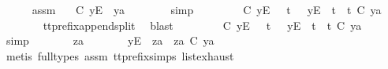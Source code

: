 \ \ \ \ \isamarkupfalse%
\ assm{}\ \isamarkupfalse%
\ {\isachardoublequoteopen}{\isasymsigma}{\isacharprime}\ {\isasymle}\isactrlsub C\ {\isacharbrackleft}{\isacharbrackleft}y{\isacharbrackright}\isactrlsub E{\isacharbrackright}\ {\isacharat}\ ya{\isachardoublequoteclose}\isanewline
\ \ \ \ \ \ \isamarkupfalse%
\ simp\isanewline
\ \ \ \ \isamarkupfalse%
\ \isamarkupfalse%
\ {\isachardoublequoteopen}{\isasymsigma}{\isacharprime}\ {\isasymle}\isactrlsub C\ {\isacharbrackleft}{\isacharbrackleft}y{\isacharbrackright}\isactrlsub E{\isacharbrackright}\ \ {\isasymor}\ {\isacharparenleft}{\isasymexists}t{\isacharprime}{\isachardot}\ {\isasymsigma}{\isacharprime}\ {\isacharequal}\ {\isacharbrackleft}{\isacharbrackleft}y{\isacharbrackright}\isactrlsub E{\isacharbrackright}\ {\isacharat}\ t{\isacharprime}\ {\isasymand}\ t{\isacharprime}\ {\isasymle}\isactrlsub C\ ya{\isacharparenright}{\isachardoublequoteclose}\isanewline
\ \ \ \ \ \ \isamarkupfalse%
\ tt{\isacharunderscore}prefix{\isacharunderscore}append{\isacharunderscore}split\ \isamarkupfalse%
\ blast\isanewline
\ \ \ \ \isamarkupfalse%
\ \isamarkupfalse%
\ {\isachardoublequoteopen}{\isasymsigma}{\isacharprime}\ {\isasymle}\isactrlsub C\ {\isacharbrackleft}{\isacharbrackleft}y{\isacharbrackright}\isactrlsub E{\isacharbrackright}\ \ {\isasymor}\ {\isacharparenleft}{\isasymexists}t{\isacharprime}{\isachardot}\ {\isasymsigma}{\isacharprime}\ {\isacharequal}\ {\isacharbrackleft}y{\isacharbrackright}\isactrlsub E\ {\isacharhash}\ t{\isacharprime}\ {\isasymand}\ t{\isacharprime}\ {\isasymle}\isactrlsub C\ ya{\isacharparenright}{\isachardoublequoteclose}\isanewline
\ \ \ \ \ \ \isamarkupfalse%
\ simp\isanewline
\ \ \ \ \isamarkupfalse%
\ \isamarkupfalse%
\ za\ \ {\isachardoublequoteopen}{\isasymsigma}{\isacharprime}\ {\isacharequal}\ {\isacharbrackleft}{\isacharbrackright}\ {\isasymor}\ {\isacharparenleft}{\isasymsigma}{\isacharprime}\ {\isacharequal}\ {\isacharbrackleft}y{\isacharbrackright}\isactrlsub E\ {\isacharhash}\ za\ {\isasymand}\ za\ {\isasymle}\isactrlsub C\ ya{\isacharparenright}{\isachardoublequoteclose}\isanewline
\ \ \ \ \ \ \isamarkupfalse%
\ {\isacharparenleft}metis\ {\isacharparenleft}full{\isacharunderscore}types{\isacharparenright}\ assm{}\ tt{\isacharunderscore}prefix{\isachardot}simps{\isacharparenleft}{}{\isacharparenright}\ list{\isachardot}exhaust{\isacharparenright}\isanewline
